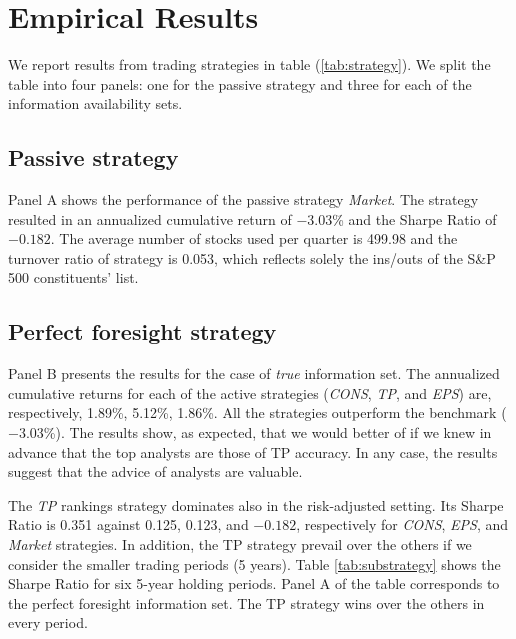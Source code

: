 \documentclass{article}
\newcommand{\tr}{\textit{true}}
\begin{document}

\section{Empirical Results}
\label{sec:results}

We report results from trading strategies in table (\ref{tab:strategy}). We split the table into four panels: one for the passive strategy and three for each of the information availability sets. 

\subsection{Passive strategy}
Panel A shows  the performance of the passive strategy \textit{Market}. The strategy resulted in an annualized cumulative return of \ensuremath{-3.03}\% and the Sharpe Ratio  of \ensuremath{-0.182}. The average number of stocks used per quarter is 499.98 and the turnover ratio of strategy is 0.053, which reflects solely the ins/outs of the S\&P 500 constituents' list.

\subsection{Perfect foresight strategy}
\label{sec:perfect}
Panel B presents the results for the case of \tr{} information set. The annualized cumulative returns for each of the active strategies (\textit{CONS}, \textit{TP}, and \textit{EPS}) are, respectively, 1.89\%, 5.12\%, 1.86\%. All the strategies outperform the benchmark (\ensuremath{-3.03}\%). The results show, as expected, that  we would better of if we knew in advance that the top analysts are those of TP accuracy. In any case, the results suggest that the advice of analysts are valuable. 


The \textit{TP} rankings strategy dominates also in the risk-adjusted setting. Its Sharpe Ratio is 0.351 against 0.125, 0.123, and \ensuremath{-0.182}, respectively for \textit{CONS}, \textit{EPS}, and \textit{Market} strategies. In addition, the TP strategy prevail over the others if we consider the smaller trading periods (5 years). Table \ref{tab:substrategy} shows the Sharpe Ratio for six 5-year holding periods. Panel A of the table corresponds to the perfect foresight information set. The TP strategy wins over the others in every period.
\end{document}
